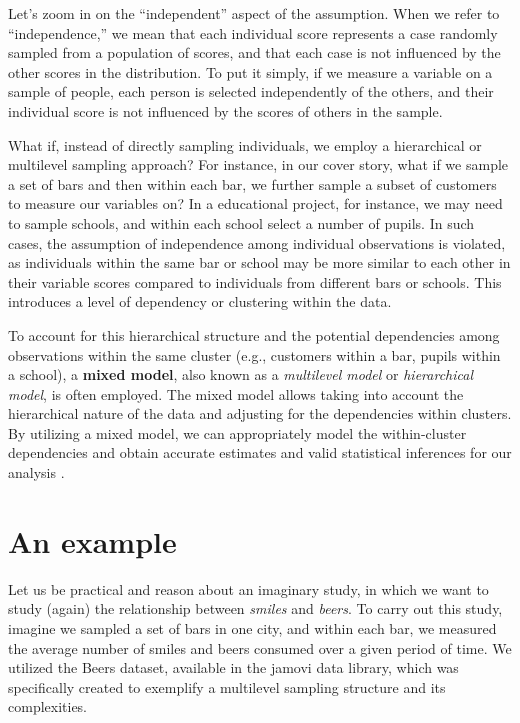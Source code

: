 \documentclass[
]{book}
\begin{document}
Let's zoom in on the ``independent'' aspect of the assumption. When we refer to ``independence,'' we mean that each individual score represents a case randomly sampled from a population of scores, and that each case is not influenced by the other scores in the distribution. To put it simply, if we measure a variable on a sample of people, each person is selected independently of the others, and their individual score is not influenced by the scores of others in the sample.

What if, instead of directly sampling individuals, we employ a hierarchical or multilevel sampling approach? For instance, in our cover story, what if we sample a set of bars and then within each bar, we further sample a subset of customers to measure our variables on? In a educational project, for instance, we may need to sample schools, and within each school select a number of pupils. In such cases, the assumption of independence among individual observations is violated, as individuals within the same bar or school may be more similar to each other in their variable scores compared to individuals from different bars or schools. This introduces a level of dependency or clustering within the data.

To account for this hierarchical structure and the potential dependencies among observations within the same cluster (e.g., customers within a bar, pupils within a school), a \textbf{mixed model}, also known as a \emph{multilevel model} or \emph{hierarchical model}, is often employed. The mixed model allows taking into account the hierarchical nature of the data and adjusting for the dependencies within clusters. By utilizing a mixed model, we can appropriately model the within-cluster dependencies and obtain accurate estimates and valid statistical inferences for our analysis \citep{verbeke2000linear, stroup2013generalized, mcculloch2001generalized}.

\hypertarget{an-example}{%
\section{An example}\label{an-example}}

Let us be practical and reason about an imaginary study, in which we want to study (again) the relationship between \emph{smiles} and \emph{beers}. To carry out this study, imagine we sampled a set of bars in one city, and within each bar, we measured the average number of smiles and beers consumed over a given period of time. We utilized the Beers dataset, available in the {jamovi} data library, which was specifically created to exemplify a multilevel sampling structure and its complexities.
\end{document}
